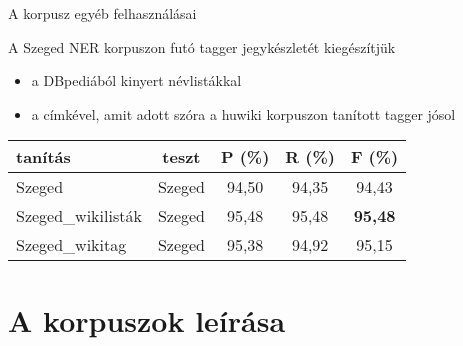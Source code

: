 \documentclass[utf8x,t]{beamer}
\newcommand{\vitem}{\item \vspace{4pt}}
\begin{document}
\begin{frame}{A korpusz egyéb felhasználásai}

\bigskip

A Szeged NER korpuszon futó tagger jegykészletét kiegészítjük

\begin{itemize}
\item a DBpediából kinyert névlistákkal
\item a címkével, amit adott szóra a huwiki korpuszon tanított tagger jósol
\end{itemize}

\begin{center}
\begin{tabular}{lcccc}
\toprule 
\bf tanítás & \bf teszt & \bf P (\%) & \bf R (\%) & \bf F (\%) \\ 
\midrule
Szeged & Szeged & 94,50 & 94,35 & 94,43 \\
Szeged\_wikilisták & Szeged & 95,48 & 95,48 & \textbf{95,48} \\
Szeged\_wikitag & Szeged & 95,38 & 94,92 & 95,15 \\
\bottomrule
\end{tabular}
\end{center}

\end{frame}




\section{A korpuszok leírása}
\end{document}
